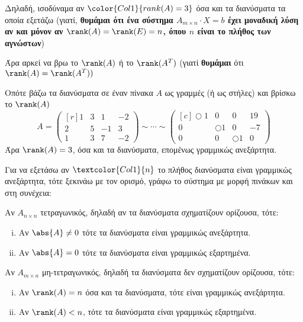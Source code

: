 \documentclass[a4paper,table]{report}
\begin{document}
Δηλαδή, ισοδύναμα αν $ \color{Col1}{rank(A) = 3} $ όσα και τα διανύσματα 
τα οποία εξετάζω (γιατί, \textbf{θυμάμαι ότι ένα σύστημα $ A_{m \times n} \cdot X = b $ 
  έχει μοναδική λύση αν και μόνον αν $ \rank(A) = \rank(E) = n $, όπου $n$ είναι το 
πλήθος των αγνώστων})

Άρα αρκεί να βρω το $ \rank(A) $ ή το $ \rank(A^{T}) $ (γιατί \textbf{θυμάμαι} ότι 
$ \rank(A) = \rank(A^{T})) $ 

Οπότε βάζω τα διανύσματα σε έναν πίνακα $A$ ως γραμμές (ή ως στήλες) και βρίσκω το 
$ \rank(A) $
\[
  A = 
  \begin{pmatrix*}[r]
    1 & 3 & 1 &-2 \\
    2 & 5 & -1 & 3 \\
    1 & 3 & 7 &  -2
  \end{pmatrix*} \sim \cdots \sim 
  \begin{pmatrix*}[c]
    \Circle{1} & 0 & 0 & 19 \\
    0 & \Circle{1} & 0 & -7 \\
    0 & 0 & \Circle{1} & 0
  \end{pmatrix*}
\] 
Άρα $ \rank(A) = 3 $, όσα και τα διανύσματα, επομένως γραμμικώς ανεξάρτητα.

\begin{concl}
  Για να εξετάσω αν $\textcolor{Col1}{n}$ το πλήθος διανύσματα είναι γραμμικώς 
  ανεξάρτητα, τότε ξεκινάω με τον ορισμό, γράφω το σύστημα με μορφή 
  πινάκων και στη συνέχεια:
  \begin{myitemize}
    \item Αν $A_{n \times n}$ τετραγωνικός, δηλαδή αν τα διανύσματα σχηματίζουν 
      ορίζουσα, τότε: 
      \begin{enumerate}[i)]
        \item Αν $ \abs{A} \neq 0 $ τότε τα διανύσματα είναι γραμμικώς ανεξάρτητα.
        \item Αν $ \abs{A} = 0 $ τότε τα διανύσματα είναι γραμμικώς εξαρτημένα.
      \end{enumerate}
    \item Αν $A_{m\times n}$ μη-τετραγωνικός, δηλαδή τα διανύσματα δεν σχηματίζουν
      ορίζουσα, τότε:
      \begin{enumerate}[i)]
        \item Αν $ \rank(A) = n $ όσα και τα διανύσματα, τότε είναι γραμμικώς ανεξάρτητα.
        \item Αν $ \rank(A) < n $, τότε τα διανύσματα είναι γραμμικώς εξαρτημένα.
      \end{enumerate}
  \end{myitemize}
\end{concl}
\end{document}
